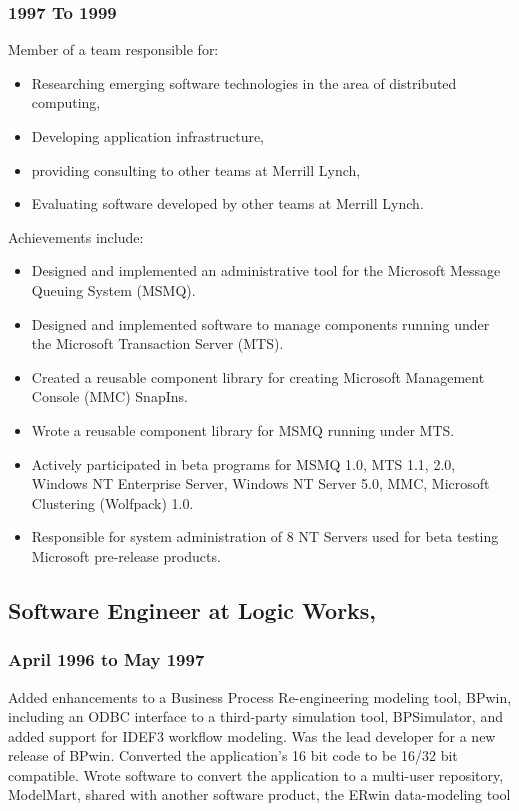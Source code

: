 \documentclass[letterpaper]{article}
\begin{document}
\subsubsection{1997 To 1999}
\label{sec-2-6-1}
\vspace{0.1in}

Member of a team responsible for:
\begin{itemize}
\item Researching emerging software technologies in the area of distributed computing,
\item Developing application infrastructure,
\item providing consulting to other teams at Merrill Lynch,
\item Evaluating software developed by other teams at Merrill Lynch.
\end{itemize}

\vspace{0.1in}
Achievements include:
\begin{itemize}
\item Designed and implemented an administrative tool for the Microsoft Message Queuing System (MSMQ).
\item Designed and implemented software to manage components running under the Microsoft Transaction Server (MTS).
\item Created a reusable component library for creating Microsoft Management Console (MMC) SnapIns.
\item Wrote a reusable component library for MSMQ running under MTS.
\item Actively participated in beta programs for MSMQ 1.0, MTS 1.1, 2.0, Windows NT Enterprise Server, Windows NT Server 5.0, MMC, Microsoft Clustering (Wolfpack) 1.0.
\item Responsible for system administration of 8 NT Servers used for beta testing Microsoft pre-release products.
\end{itemize}

\subsection{Software Engineer at Logic Works,}
\label{sec-2-7}
\subsubsection{April 1996 to May 1997}
\label{sec-2-7-1}
\vspace{0.1in}

Added enhancements to a Business Process Re-engineering modeling tool,
BPwin, including an ODBC interface to a third-party simulation tool,
BPSimulator, and added support for IDEF3 workflow modeling. Was the
lead developer for a new release of BPwin. Converted the application's
16 bit code to be 16/32 bit compatible. Wrote software to convert the
application to a multi-user repository, ModelMart, shared with another
software product, the ERwin data-modeling tool
\end{document}
